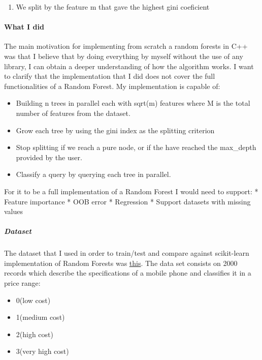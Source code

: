 \documentclass[11pt]{article}
\providecommand{\tightlist}{%
      \setlength{\itemsep}{0pt}\setlength{\parskip}{0pt}}
\begin{document}
\begin{enumerate}
\def\labelenumi{\arabic{enumi}.}
\setcounter{enumi}{2}
\tightlist
\item
  We split by the feature m that gave the highest gini coeficient
\end{enumerate}

    \paragraph{What I did}\label{what-i-did}

The main motivation for implementing from scratch a random forests in
C++ was that I believe that by doing everything by myself without the
use of any library, I can obtain a deeper understanding of how the
algorithm works. I want to clarify that the implementation that I did
does not cover the full functionalities of a Random Forest. My
implementation is capable of:

\begin{itemize}
\tightlist
\item
  Building n trees in parallel each with sqrt(m) features where M is the
  total number of features from the dataset.
\item
  Grow each tree by using the gini index as the splitting criterion
\item
  Stop splitting if we reach a pure node, or if the have reached the
  max\_depth provided by the user.
\item
  Classify a query by querying each tree in parallel.
\end{itemize}

For it to be a full implementation of a Random Forest I would need to
support: * Feature importance * OOB error * Regression * Support
datasets with missing values

\subparagraph{Dataset}\label{dataset}

The dataset that I used in order to train/test and compare against
scikit-learn implementation of Random Forests was
\href{https://www.kaggle.com/iabhishekofficial/mobile-price-classification/data}{this}.
The data set consists on 2000 records which describe the specifications
of a mobile phone and classifies it in a price range:

\begin{itemize}
\tightlist
\item
  0(low cost)
\item
  1(medium cost)
\item
  2(high cost)
\item
  3(very high cost)
\end{itemize}
\end{document}
